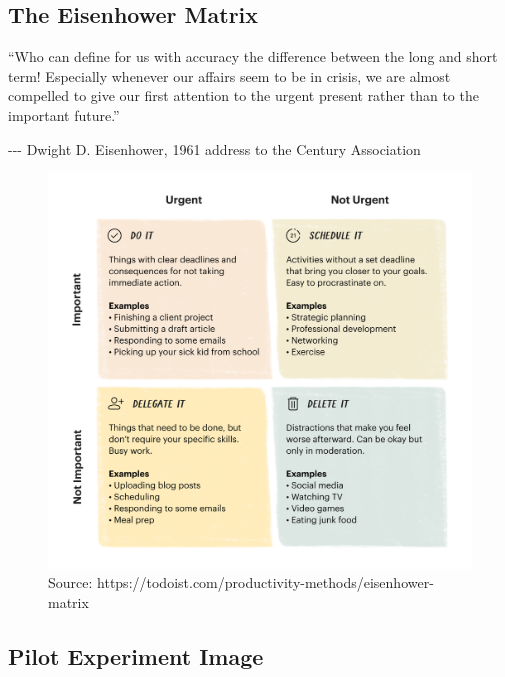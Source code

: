 \documentclass[
]{article}
\begin{document}
\hypertarget{sec-eisenhower}{%
\subsection{The Eisenhower Matrix}\label{sec-eisenhower}}

``Who can define for us with accuracy the difference between the long
and short term! Especially whenever our affairs seem to be in crisis, we
are almost compelled to give our first attention to the urgent present
rather than to the important future.''

-\/-\/- Dwight D. Eisenhower, 1961 address to the Century Association

\begin{figure}

{\centering \includegraphics[width=5.36in,height=\textheight]{images/eisenhower-matrix.png}

}

\caption{Source:
https://todoist.com/productivity-methods/eisenhower-matrix}

\end{figure}

\newpage{}

\hypertarget{pilot-experiment-image}{%
\subsection{Pilot Experiment Image}\label{pilot-experiment-image}}
\end{document}
